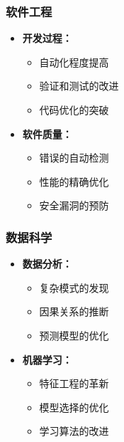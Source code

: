 \documentclass[a4paper,12pt]{ctexart}
\begin{document}
\subsubsection{软件工程}
\begin{itemize}
    \item \textbf{开发过程：}
        \begin{itemize}
            \item 自动化程度提高
            \item 验证和测试的改进
            \item 代码优化的突破
        \end{itemize}
    \item \textbf{软件质量：}
        \begin{itemize}
            \item 错误的自动检测
            \item 性能的精确优化
            \item 安全漏洞的预防
        \end{itemize}
\end{itemize}

\subsubsection{数据科学}
\begin{itemize}
    \item \textbf{数据分析：}
        \begin{itemize}
            \item 复杂模式的发现
            \item 因果关系的推断
            \item 预测模型的优化
        \end{itemize}
    \item \textbf{机器学习：}
        \begin{itemize}
            \item 特征工程的革新
            \item 模型选择的优化
            \item 学习算法的改进
        \end{itemize}
\end{itemize}
\end{document}
